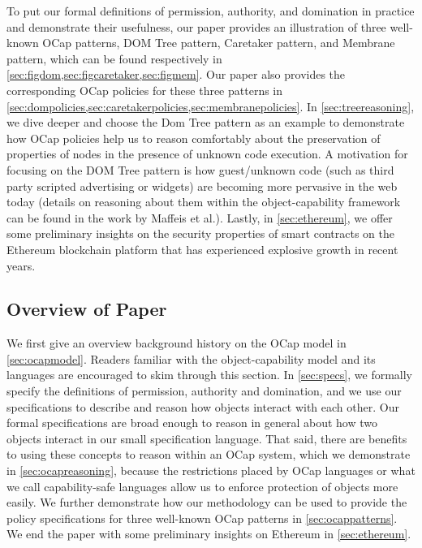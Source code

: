 \documentclass[a4paper,11pt,twoside]{article}
\begin{document}
To put our formal definitions of permission, authority, and domination in practice and demonstrate their usefulness, 
our paper provides an illustration of three well-known OCap patterns, DOM Tree pattern, Caretaker pattern, and Membrane pattern, which can be found respectively in \cref{sec:figdom,sec:figcaretaker,sec:figmem}. Our paper also provides the corresponding OCap policies for these three patterns in \cref{sec:dompolicies,sec:caretakerpolicies,sec:membranepolicies}.  In \cref{sec:treereasoning}, we dive deeper and choose the Dom Tree pattern as an example to demonstrate how OCap policies help us to reason comfortably about the preservation of properties of nodes in the presence of unknown code execution. A motivation for focusing on the DOM Tree pattern is how guest/unknown code (such as third party scripted advertising or widgets) are becoming more pervasive in the web today (details on reasoning about them within the object-capability framework can be found in the work by Maffeis et al.\cite{maffeis2010}). Lastly, in \cref{sec:ethereum}, we offer some preliminary insights on the security properties of smart contracts on the Ethereum blockchain platform that has experienced explosive growth in recent years.

\subsection{Overview of Paper}
We first give an overview background history on the OCap model in \cref{sec:ocapmodel}. Readers familiar with the object-capability model and its languages are encouraged to skim through this section. In \cref{sec:specs}, we formally specify the definitions of permission, authority and domination, and we use our specifications to describe and reason how objects interact with each other. Our formal specifications are broad enough to reason in general about how two objects interact in our small specification language. That said, there are benefits to using these concepts to reason within an OCap system, which we demonstrate in \cref{sec:ocapreasoning}, because the restrictions placed by OCap languages or what we call capability-safe languages allow us to enforce protection of objects more easily. We further demonstrate how our methodology can be used to provide the policy specifications for three well-known OCap patterns in \cref{sec:ocappatterns}. We end the paper with some preliminary insights on Ethereum in \cref{sec:ethereum}.
\end{document}
